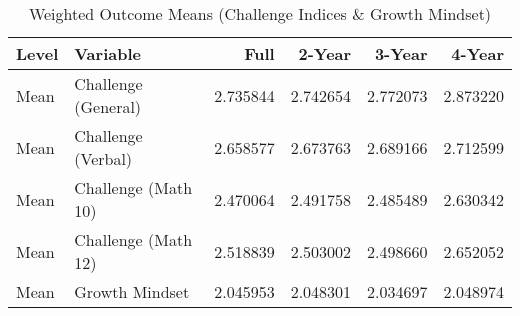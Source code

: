 \begin{table}[!h]
\centering
\caption{Weighted Outcome Means (Challenge Indices & Growth Mindset)}
\centering
\begin{tabular}[t]{llrrrr}
\toprule
Level & Variable & Full & 2-Year & 3-Year & 4-Year\\
\midrule
Mean & Challenge (General) & 2.735844 & 2.742654 & 2.772073 & 2.873220\\
Mean & Challenge (Verbal) & 2.658577 & 2.673763 & 2.689166 & 2.712599\\
Mean & Challenge (Math 10) & 2.470064 & 2.491758 & 2.485489 & 2.630342\\
Mean & Challenge (Math 12) & 2.518839 & 2.503002 & 2.498660 & 2.652052\\
Mean & Growth Mindset & 2.045953 & 2.048301 & 2.034697 & 2.048974\\
\bottomrule
\end{tabular}
\end{table}
